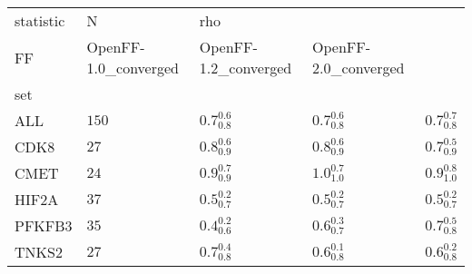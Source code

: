 \begin{tabular}{lllll}
\toprule
statistic &      N & \multicolumn{3}{l}{rho} \\
FF & OpenFF-1.0_converged & OpenFF-1.2_converged & OpenFF-2.0_converged \\
set    &        &                      &                      &                      \\
\midrule
ALL    &  $150$ &    $0.7^{0.6}_{0.8}$ &    $0.7^{0.6}_{0.8}$ &    $0.7^{0.7}_{0.8}$ \\
CDK8   &   $27$ &    $0.8^{0.6}_{0.9}$ &    $0.8^{0.6}_{0.9}$ &    $0.7^{0.5}_{0.9}$ \\
CMET   &   $24$ &    $0.9^{0.7}_{0.9}$ &    $1.0^{0.7}_{1.0}$ &    $0.9^{0.8}_{1.0}$ \\
HIF2A  &   $37$ &    $0.5^{0.2}_{0.7}$ &    $0.5^{0.2}_{0.7}$ &    $0.5^{0.2}_{0.7}$ \\
PFKFB3 &   $35$ &    $0.4^{0.2}_{0.6}$ &    $0.6^{0.3}_{0.7}$ &    $0.7^{0.5}_{0.8}$ \\
TNKS2  &   $27$ &    $0.7^{0.4}_{0.8}$ &    $0.6^{0.1}_{0.8}$ &    $0.6^{0.2}_{0.8}$ \\
\bottomrule
\end{tabular}
